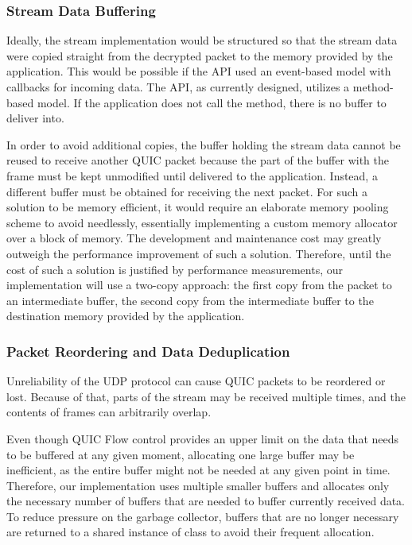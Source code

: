 \subsubsection{Stream Data Buffering}

Ideally, the stream implementation would be structured so that the stream data were copied straight
from the decrypted packet to the memory provided by the application. This would be possible if the
API used an event-based model with callbacks for incoming data. The API, as currently designed,
utilizes a method-based model. If the application does not call the  method, there
is no buffer to deliver into.

In order to avoid additional copies, the buffer holding the stream data cannot be reused to receive
another QUIC packet because the part of the buffer with the \STREAM{} frame must be kept unmodified
until delivered to the application. Instead, a different buffer must be obtained for receiving the
next packet. For such a solution to be memory efficient, it would require an elaborate memory
pooling scheme to avoid needlessly, essentially implementing a custom memory allocator over a block
of memory. The development and maintenance cost may greatly outweigh the performance improvement of
such a solution. Therefore, until the cost of such a solution is justified by performance
measurements, our implementation will use a two-copy approach: the first copy from the packet to an
intermediate buffer, the second copy from the intermediate buffer to the destination memory provided
by the application.



\subsubsection{Packet Reordering and Data Deduplication}

Unreliability of the UDP protocol can cause QUIC packets to be reordered or lost. Because of that,
parts of the stream may be received multiple times, and the contents of \STREAM{} frames can
arbitrarily overlap.

Even though QUIC Flow control provides an upper limit on the data that needs to be buffered at any
given moment, allocating one large buffer may be inefficient, as the entire buffer might not be
needed at any given point in time. Therefore, our implementation uses multiple smaller buffers and
allocates only the necessary number of buffers that are needed to buffer currently received data. To
reduce pressure on the garbage collector, buffers that are no longer necessary are returned to a
shared instance of \ArrayPoolOf{\byte{}} class to avoid their frequent allocation.

